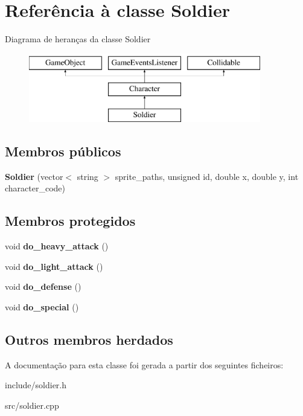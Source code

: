 \hypertarget{classSoldier}{}\section{Referência à classe Soldier}
\label{classSoldier}
Diagrama de heranças da classe Soldier\begin{figure}[H]
\begin{center}
\leavevmode
\includegraphics[height=3.000000cm]{classSoldier}
\end{center}
\end{figure}
\subsection*{Membros públicos}
\begin{DoxyCompactItemize}
\item 
\mbox{\label{classSoldier_ac0fd0515763f51a11b2785e5cac088e6}} 
{\bfseries Soldier} (vector$<$ string $>$ sprite\+\_\+paths, unsigned id, double x, double y, int character\+\_\+code)
\end{DoxyCompactItemize}
\subsection*{Membros protegidos}
\begin{DoxyCompactItemize}
\item 
\mbox{\label{classSoldier_af06682afbd0dd5f560e31228688b21fe}} 
void {\bfseries do\+\_\+heavy\+\_\+attack} ()
\item 
\mbox{\label{classSoldier_ab0941d83546b933924b17b9aaa92818c}} 
void {\bfseries do\+\_\+light\+\_\+attack} ()
\item 
\mbox{\label{classSoldier_a4c6ff38e85e61c7112526d29059480fb}} 
void {\bfseries do\+\_\+defense} ()
\item 
\mbox{\label{classSoldier_a3e5574a74b969d5b26cf3ad0f3f7f085}} 
void {\bfseries do\+\_\+special} ()
\end{DoxyCompactItemize}
\subsection*{Outros membros herdados}


A documentação para esta classe foi gerada a partir dos seguintes ficheiros\+:\begin{DoxyCompactItemize}
\item 
include/soldier.\+h\item 
src/soldier.\+cpp\end{DoxyCompactItemize}
